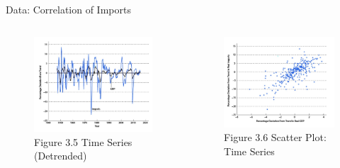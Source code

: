 \documentclass[11pt,aspectratio=43]{beamer}
\theoremstyle{definition}
\begin{document}
\begin{frame}{Data: Correlation of Imports}
\label{slide:Data__Correlation_of_Imports}
    \begin{columns}
        \begin{column}{0.5\textwidth}
            \begin{figure}
                \caption{Figure 3.5  Time Series (Detrended)}
                \includegraphics[width=\textwidth]{./figures/Figure3_5.jpg}
            \end{figure}
        \end{column}
        \begin{column}{0.5\textwidth}
            \begin{figure}
                \caption{Figure 3.6  Scatter Plot: Time Series}
                \includegraphics[width=\textwidth]{./figures/Figure3_6.jpg}
            \end{figure}
        \end{column}
    \end{columns}
\end{frame}
\end{document}

